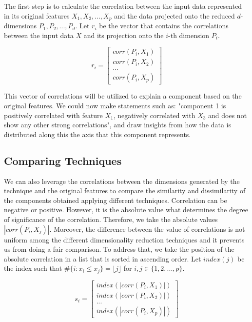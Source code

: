 The first step is to calculate the correlation between the input data represented in its original features $X_1, X_2, ..., X_p$ and the data projected onto the reduced $d$-dimensions $P_1, P_2, ..., P_d$. Let $r_i$ be the vector that contains the correlations between the input data $X$ and its projection onto the $i$-th dimension $P_i$.

$$
    r_i =
    \begin{bmatrix}
        corr(P_i, X_1) \\
        corr(P_i, X_2) \\
        ...            \\
        corr(P_i, X_p)
    \end{bmatrix}
$$

This vector of correlations will be utilized to explain a component based on the original features. We could now make statements such as: "component 1 is positively correlated with feature $X_1$, negatively correlated with $X_3$ and does not show any other strong correlations", and draw insights from how the data is distributed along this the axis that this component represents.

\subsection{Comparing Techniques}

We can also leverage the correlations between the dimensions generated by the technique and the original features to compare the similarity and dissimilarity of the components obtained applying different techniques.
Correlation can be negative or positive. However, it is the absolute value what determines the degree of significance of the correlation. Therefore, we take the absolute values $|corr(P_i,X_j)|$. Moreover, the difference between the value of correlations is not uniform among the different dimensionality reduction techniques and it prevents us from doing a fair comparison. To address that, we take the position of the absolute correlation in a list that is sorted in ascending order. Let $index(j)$ be the index such that $\#\{i : x_i \leq x_j\} = \lfloor j \rfloor$ for $i, j \in \{1,2,...,p\}$.

$$
    s_i =
    \begin{bmatrix}
        index(|corr(P_i, X_1)|) \\
        index(|corr(P_i, X_2)|) \\
        ...                     \\
        index(|corr(P_i, X_p)|)
    \end{bmatrix}
$$

